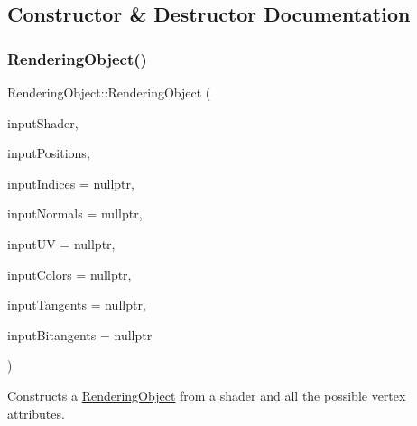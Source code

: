\subsection{Constructor \& Destructor Documentation}
\hypertarget{class_rendering_object_ab5e3376ea0eb6290cdc55750a420b9d1}{}\label{class_rendering_object_ab5e3376ea0eb6290cdc55750a420b9d1}
\subsubsection{\texorpdfstring{Rendering\+Object()}{RenderingObject()}}
{\footnotesize\ttfamily Rendering\+Object\+::\+Rendering\+Object (\begin{DoxyParamCaption}\item[{std\+::shared\+\_\+ptr$<$ class \hyperlink{class_shader_program}{Shader\+Program} $>$}]{input\+Shader,  }\item[{std\+::unique\+\_\+ptr$<$ \hyperlink{class_rendering_object_a1223b9cf03f2029b9c43d71042c2a18e}{Position\+Array} $>$}]{input\+Positions,  }\item[{std\+::unique\+\_\+ptr$<$ \hyperlink{class_rendering_object_a9931c88bca3384065c6691dfe1e60af1}{Index\+Array} $>$}]{input\+Indices = {\ttfamily nullptr},  }\item[{std\+::unique\+\_\+ptr$<$ \hyperlink{class_rendering_object_a327c4d892de8d6138fb59afa6d078257}{Normal\+Array} $>$}]{input\+Normals = {\ttfamily nullptr},  }\item[{std\+::unique\+\_\+ptr$<$ \hyperlink{class_rendering_object_a504ecd45ebe36dfa5b78c46d64d9904a}{U\+V\+Array} $>$}]{input\+UV = {\ttfamily nullptr},  }\item[{std\+::unique\+\_\+ptr$<$ \hyperlink{class_rendering_object_a8a12e1f9be788d99af6c089e1c600022}{Color\+Array} $>$}]{input\+Colors = {\ttfamily nullptr},  }\item[{std\+::unique\+\_\+ptr$<$ \hyperlink{class_rendering_object_a45b53e911c2f0131aa10e89869d38944}{Tangent\+Array} $>$}]{input\+Tangents = {\ttfamily nullptr},  }\item[{std\+::unique\+\_\+ptr$<$ \hyperlink{class_rendering_object_a6c6bf305a5f0f9ce1006f374c753c856}{Bitangent\+Array} $>$}]{input\+Bitangents = {\ttfamily nullptr} }\end{DoxyParamCaption})}



Constructs a \hyperlink{class_rendering_object}{Rendering\+Object} from a shader and all the possible vertex attributes.


